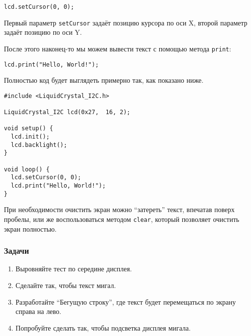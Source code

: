 \documentclass[../sparc.tex]{subfiles}
\begin{document}
\begin{verbatim}
lcd.setCursor(0, 0);
\end{verbatim}

Первый параметр \texttt{setCursor} задаёт позицию курсора по оси X, второй
параметр задаёт позицию по оси Y.

После этого наконец-то мы можем вывести текст с помощью метода \texttt{print}:

\begin{verbatim}
lcd.print("Hello, World!");
\end{verbatim}

Полностью код будет выглядеть примерно так, как показано ниже.

\begin{verbatim}
#include <LiquidCrystal_I2C.h>

LiquidCrystal_I2C lcd(0x27,  16, 2);

void setup() {
  lcd.init();
  lcd.backlight();
}

void loop() {
  lcd.setCursor(0, 0);
  lcd.print("Hello, World!");
}
\end{verbatim}

При необходимости очистить экран можно ``затереть'' текст, впечатав поверх
пробелы, или же воспользоваться методом \texttt{clear}, который позволяет
очистить экран полностью.

\subsubsection{Задачи}
\begin{enumerate}
\item Выровняйте тест по середине дисплея.
\item Сделайте так, чтобы текст мигал.
\item Разработайте ``Бегущую строку'', где текст будет перемещаться по экрану
  справа на лево.
\item Попробуйте сделать так, чтобы подсветка дисплея мигала.
\end{enumerate}
\end{document}
